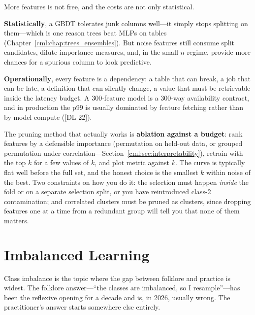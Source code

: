 More features is not free, and the costs are not only statistical.

\textbf{Statistically}, a GBDT tolerates junk columns well---it simply stops splitting on them---which is one reason trees beat MLPs on tables (Chapter~\ref{cml:chap:trees_ensembles}). But noise features still consume split candidates, dilute importance measures, and, in the small-$n$ regime, provide more chances for a spurious column to look predictive.

\textbf{Operationally}, every feature is a dependency: a table that can break, a job that can be late, a definition that can silently change, a value that must be retrievable inside the latency budget. A 300-feature model is a 300-way availability contract, and in production the p99 is usually dominated by feature fetching rather than by model compute ([DL 22]).

The pruning method that actually works is \textbf{ablation against a budget}: rank features by a defensible importance (permutation on held-out data, or grouped permutation under correlation---Section~\ref{cml:sec:interpretability}), retrain with the top $k$ for a few values of $k$, and plot metric against $k$. The curve is typically flat well before the full set, and the honest choice is the smallest $k$ within noise of the best. Two constraints on how you do it: the selection must happen \emph{inside} the fold or on a separate selection split, or you have reintroduced class-2 contamination; and correlated clusters must be pruned as clusters, since dropping features one at a time from a redundant group will tell you that none of them matters.

\section{Imbalanced Learning}
\label{cml:sec:imbalance}

Class imbalance is the topic where the gap between folklore and practice is widest. The folklore answer---``the classes are imbalanced, so I resample''---has been the reflexive opening for a decade and is, in 2026, usually wrong. The practitioner's answer starts somewhere else entirely.

